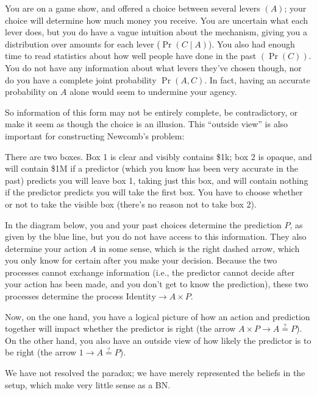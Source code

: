 \documentclass{article}
\begin{document}
	\begin{example}
		You are on a game show, and offered a choice between several levers $(A)$; your choice will determine how much money you receive. You are uncertain what each lever does, but you do have a vague intuition about the mechanism, giving you a distribution over amounts for each lever ($\Pr(C \mid A)$). You also had enough time to read statistics about how well people have done in the past $(\Pr(C))$. You do not have any information about what levers they've chosen though, nor do you have a complete joint probability $\Pr(A, C)$. In fact, having an accurate probability on $A$ alone would seem to undermine your agency.
	\end{example}
	
	
	So information of this form may not be entirely complete, be contradictory, or make it seem as though the choice is an illusion. This ``outside view'' is also important for constructing Newcomb's problem:
	
	\begin{example}[Newcomb]
		There are two boxes. Box 1 is clear and visibly contains \$1k; box 2 is opaque, and will contain \$1M if a predictor (which you know has been very accurate in the past) predicts you will leave box 1, taking just this box, and will contain nothing if the predictor predicts you will take the first box. You have to choose whether or not to take the visible box (there's no reason not to take box 2).
		
		In the diagram below, you and your past choices determine the prediction $P$, as given by the blue line, but you do not have access to this information. They also determine your action $A$ in some sense, which is the right dashed arrow, which you only know for certain after you make your decision. Because the two processes cannot exchange information (i.e., the predictor cannot decide after your action has been made, and you don't get to know the prediction), these two processes determine the process $\mathrm{Identity} \to A \times P$.
		\begin{center}
		\end{center}
		Now, on the one hand, you have a logical picture of how an action and prediction together will impact whether the predictor is right (the arrow $A \times P \to A \stackrel{?}{=} P$). On the other hand, you also have an outside view of how likely the predictor is to be right (the arrow $1 \to A \stackrel{?}{=} P$). 
		
		We have not resolved the paradox; we have merely represented the beliefs in the setup, which make very little sense as a BN.
	\end{example}
	
\end{document}
